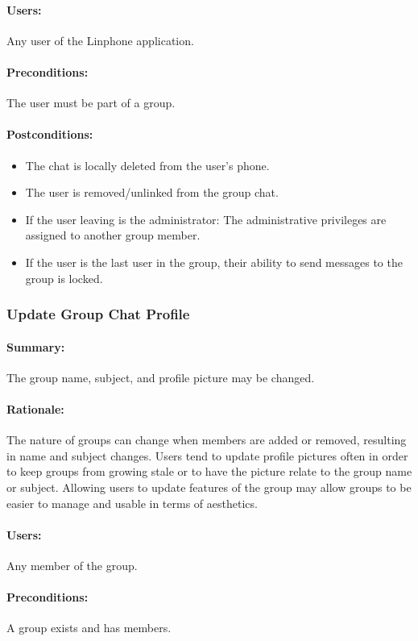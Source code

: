 \documentclass[11pt]{article}
\begin{document}
\paragraph{Users:} Any user of the Linphone application.
\paragraph{Preconditions:} The user must be part of a group.
\paragraph{{Postconditions:}} 
\begin{itemize}
	\item The chat is locally deleted from the user's phone.
	\item The user is removed/unlinked from the group chat.
	\item If the user leaving is the administrator: The administrative privileges are assigned to another group member.
	\item If the user is the last user in the group, their ability to send messages to the group is locked.
\end{itemize}

\subsubsection{Update Group Chat Profile} \label{UC-update-group}
\paragraph{Summary:}
The group name, subject, and profile picture may be changed.
\paragraph{Rationale:}
The nature of groups can change when members are added or removed, resulting in name and subject changes. Users tend to update profile pictures often in order to keep groups from growing stale or to have the picture relate to the group name or subject. Allowing users to update features of the group may allow groups to be easier to manage and usable in terms of aesthetics.
\paragraph{Users:}
Any member of the group.
\paragraph{Preconditions:}
A group exists and has members.
\end{document}
